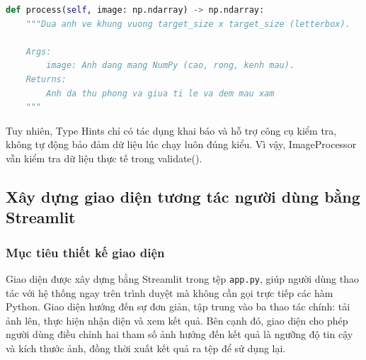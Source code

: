 \documentclass[a4paper,13pt]{extarticle}
\begin{document}
\begin{lstlisting}[language=Python, numbers=none, caption={Docstring và Type Hints trong ImageProcessor}]
def process(self, image: np.ndarray) -> np.ndarray:
    """Dua anh ve khung vuong target_size x target_size (letterbox).

    Args:
        image: Anh dang mang NumPy (cao, rong, kenh mau).
    Returns:
        Anh da thu phong va giua ti le va dem mau xam 
    """
\end{lstlisting}


Tuy nhiên, Type Hints chỉ có tác dụng khai báo và hỗ trợ công cụ kiểm tra, không tự động bảo đảm dữ liệu lúc chạy luôn đúng kiểu. Vì vậy, ImageProcessor vẫn kiểm tra dữ liệu thực tế trong validate().

\subsection{Xây dựng giao diện tương tác người dùng bằng Streamlit}

\subsubsection{Mục tiêu thiết kế giao diện}
Giao diện được xây dựng bằng Streamlit trong tệp \texttt{app.py}, giúp người dùng thao tác với hệ thống ngay trên trình duyệt mà không cần gọi trực tiếp các hàm Python. Giao diện hướng đến sự đơn giản, tập trung vào ba thao tác chính: tải ảnh lên, thực hiện nhận diện và xem kết quả. Bên cạnh đó, giao diện cho phép người dùng điều chỉnh hai tham số ảnh hưởng đến kết quả là ngưỡng độ tin cậy và kích thước ảnh, đồng thời xuất kết quả ra tệp để sử dụng lại.
\end{document}
